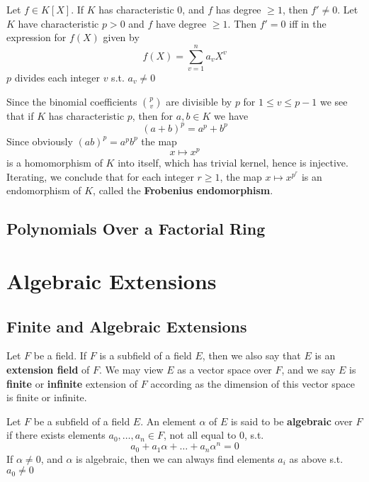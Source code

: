 \documentclass[11pt]{article}
\begin{document}
\begin{proposition}[]
Let \(f\in K[X]\). If \(K\) has characteristic 0, and \(f\) has degree \(\ge 1\), then \(f'\neq 0\).
Let \(K\) have characteristic \(p>0\) and \(f\) have degree \(\ge 1\). Then \(f'=0\) iff in the
expression for \(f(X)\) given by
\begin{equation*}
f(X)=\sum_{v=1}^na_vX^v
\end{equation*}
\(p\) divides each integer \(v\) s.t. \(a_v\neq 0\)
\end{proposition}

Since the binomial coefficients \(\binom{p}{v}\) are divisible by \(p\) for \(1\le v\le p-1\) we see
that if \(K\) has characteristic \(p\), then for \(a,b\in K\) we have
\begin{equation*}
(a+b)^p=a^p+b^p
\end{equation*}
Since obviously \((ab)^p=a^pb^p\) the map
\begin{equation*}
x\mapsto x^p
\end{equation*}
is a homomorphism of \(K\) into itself, which has trivial kernel, hence is injective. Iterating,
we conclude that for each integer \(r\ge 1\), the map \(x\mapsto x^{p^r}\) is an endomorphism of \(K\),
called the \textbf{Frobenius endomorphism}.
\subsection{Polynomials Over a Factorial Ring}
\label{sec:org38591cc}

\section{Algebraic Extensions}
\label{sec:org5b984ed}
\subsection{Finite and Algebraic Extensions}
\label{sec:org59bac54}
Let \(F\) be a field. If \(F\) is a subfield of a field \(E\), then we also say that \(E\) is an
\textbf{extension field} of \(F\). We may view \(E\) as a vector space over \(F\), and we say \(E\) is
\textbf{finite} or \textbf{infinite} extension of \(F\) according as the dimension of this vector space is finite
or infinite.

Let \(F\) be a subfield of a field \(E\). An element \(\alpha\) of \(E\) is said to be \textbf{algebraic}
over \(F\) if there exists elements \(a_0,\dots,a_n\in F\), not all equal to 0, s.t.
\begin{equation*}
a_0+a_1\alpha+\dots+a_n\alpha^n=0
\end{equation*}
If \(\alpha\neq 0\), and \(\alpha\) is algebraic, then we can always find elements \(a_i\) as above s.t. \(a_0\neq 0\)
\end{document}
